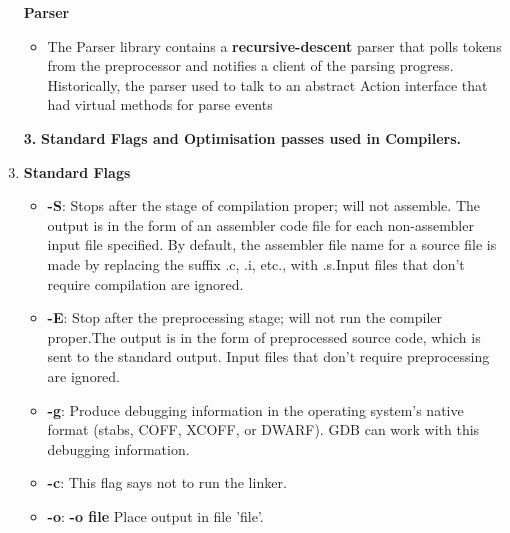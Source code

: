 \documentclass[english,a4paper,12pt]{article}
\begin{document}
\begin{enumerate}
     \textbullet \textbf{Parser}
     \begin{itemize}
         \item The Parser library contains a \textbf{recursive-descent} parser that polls tokens from the preprocessor and notifies a client of the parsing progress. Historically, the parser used to talk to an abstract Action interface that had virtual methods for parse events
     \end{itemize}

    
    \newpage

 \item[\textbf{3.}] \textbf{Standard Flags and Optimisation passes used in Compilers.}
\item {\textbf{Standard Flags}}
    \begin{itemize}
\item \textbf{-S}: Stops after the stage of compilation proper; will not assemble.  The output is in the form of an assembler code file for each non-assembler input file specified. By default, the assembler file name for a source file is made by replacing the suffix .c, .i, etc., with .s.Input files that don't require compilation are ignored.
\item \textbf{-E}: Stop after the preprocessing stage; will not run the compiler proper.The output is in the form of preprocessed source code, which is sent to the standard output. Input files that don't require preprocessing are ignored.

\item \textbf{-g}: Produce debugging information in the operating system's native format (stabs, COFF, XCOFF, or DWARF).  GDB can work with this debugging information.

\item \textbf{-c}: This flag says not to run the linker.

\item \textbf{-o}: \textbf{-o file} Place output in file 'file'.
    \end{itemize} 
    

\end{enumerate}
\end{document}
